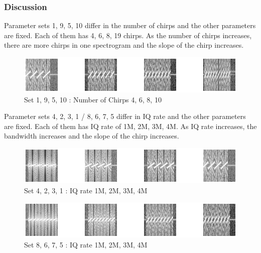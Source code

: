     \subsubsection*{Discussion}
    Parameter sets 1, 9, 5, 10 differ in the number of chirps and the other parameters are fixed. Each of them has 4, 6, 8, 19 chirps. As the number of chirps increases, there are more chirps in one spectrogram and the slope of the chirp increases. \\
    
    \vspace{-4mm}  
    \begin{figure}[!h]\centering
    \hspace{15mm}
		\includegraphics[width=.95\textwidth]{image/week04/1-1-2.png}
		\caption{\footnotesize Set 1, 9, 5, 10 : Number of Chirps 4, 6, 8, 10}
		\vspace{-10pt}
    \end{figure}
    
    Parameter sets 4, 2, 3, 1 / 8, 6, 7, 5 differ in IQ rate and the other parameters are fixed. Each of them has IQ rate of 1M, 2M, 3M, 4M. As IQ rate increases, the bandwidth increases and the slope of the chirp increases. \\
    
    \vspace{-4mm}  
    \begin{figure}[!h]\centering
    \hspace{15mm}
		\includegraphics[width=.95\textwidth]{image/week04/1-1-3.png}
		\caption{\footnotesize Set 4, 2, 3, 1 : IQ rate 1M, 2M, 3M, 4M}
		\vspace{-10pt}
    \end{figure}
 \clearpage
    \begin{figure}[!h]\centering
    \hspace{15mm}
		\includegraphics[width=.95\textwidth]{image/week04/1-1-4.png}
		\caption{\footnotesize Set 8, 6, 7, 5 : IQ rate 1M, 2M, 3M, 4M}
		\vspace{-10pt}
    \end{figure}
